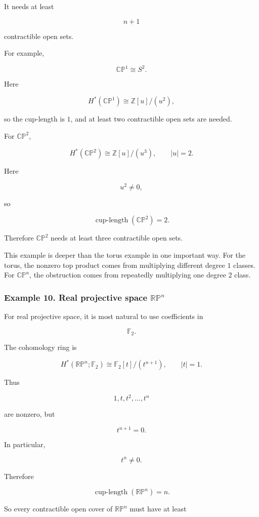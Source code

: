 \documentclass[12pt,a4paper]{article}
\theoremstyle{notespace}
\begin{document}
It needs at least

\[
\boxed{
	n+1
}
\]

contractible open sets.

For example,

\[
\mathbb{CP}^1\cong S^2.
\]

Here

\[
H^*(\mathbb{CP}^1)
\cong
\mathbb Z[u]/(u^2),
\]

so the cup-length is \(1\), and at least two contractible open sets are needed.

For \(\mathbb{CP}^2\),

\[
H^*(\mathbb{CP}^2)
\cong
\mathbb Z[u]/(u^3),
\qquad
|u|=2.
\]

Here

\[
u^2\neq 0,
\]

so

\[
\operatorname{cup\text{-}length}(\mathbb{CP}^2)=2.
\]

Therefore \(\mathbb{CP}^2\) needs at least three contractible open sets.

This example is deeper than the torus example in one important way. For the torus, the nonzero top product comes from multiplying different degree \(1\) classes. For \(\mathbb{CP}^n\), the obstruction comes from repeatedly multiplying one degree \(2\) class.

\subsubsection{Example 10. Real projective space \(\mathbb{RP}^n\)}

For real projective space, it is most natural to use coefficients in

\[
\mathbb F_2.
\]

The cohomology ring is

\[
H^*(\mathbb{RP}^n;\mathbb F_2)
\cong
\mathbb F_2[t]/(t^{n+1}),
\qquad
|t|=1.
\]

Thus

\[
1,t,t^2,\dots,t^n
\]

are nonzero, but

\[
t^{n+1}=0.
\]

In particular,

\[
t^n\neq 0.
\]

Therefore

\[
\operatorname{cup\text{-}length}(\mathbb{RP}^n)=n.
\]

So every contractible open cover of \(\mathbb{RP}^n\) must have at least
\end{document}
